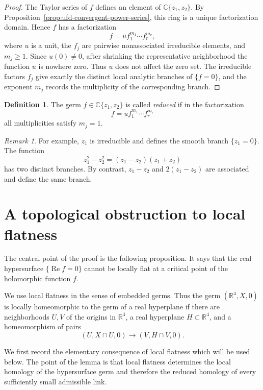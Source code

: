 \documentclass[11pt]{amsart}
\theoremstyle{definition}
\newtheorem{definition}[theorem]{Definition}
\theoremstyle{remark}
\newtheorem{remark}[theorem]{Remark}
\newcommand{\C}{\mathbb C}
\newcommand{\R}{\mathbb R}
\newcommand{\re}{\operatorname{Re}}
\begin{document}
\begin{proof}
The Taylor series of $f$ defines an element of $\C\{z_1,z_2\}$. By
Proposition~\ref{prop:ufd-convergent-power-series}, this ring is a
unique factorization domain. Hence $f$ has a factorization
\[
        f=u f_1^{m_1}\cdots f_r^{m_r},
\]
where $u$ is a unit, the $f_j$ are pairwise nonassociated irreducible
elements, and $m_j\ge1$. Since $u(0)\ne0$, after shrinking the
representative neighborhood the function $u$ is nowhere zero. Thus $u$
does not affect the zero set. The irreducible factors $f_j$ give
exactly the distinct local analytic branches of $\{f=0\}$, and the
exponent $m_j$ records the multiplicity of the corresponding branch.
\end{proof}

\begin{definition}\label{def:reduced-plane-curve}
The germ $f\in\C\{z_1,z_2\}$ is called \emph{reduced} if in the
factorization
\[
        f=u f_1^{m_1}\cdots f_r^{m_r}
\]
all multiplicities satisfy $m_j=1$.
\end{definition}

\begin{remark}\label{rem:factorization-examples}
For example, $z_1$ is irreducible and defines the smooth branch
$\{z_1=0\}$. The function
\[
        z_1^2-z_2^2=(z_1-z_2)(z_1+z_2)
\]
has two distinct branches. By contrast, $z_1-z_2$ and $2(z_1-z_2)$ are
associated and define the same branch.
\end{remark}


\section{A topological obstruction to local flatness}

The central point of the proof is the following proposition. It says
that the real hypersurface \(\{\re f=0\}\) cannot be locally flat at a
critical point of the holomorphic function \(f\).

We use local flatness in the sense of embedded germs. Thus the germ
\((\R^4,X,0)\) is locally homeomorphic to the germ of a real hyperplane if
there are neighborhoods \(U,V\) of the origins in \(\R^4\), a real
hyperplane \(H\subset\R^4\), and a homeomorphism of pairs
\[
        (U,X\cap U,0)\longrightarrow (V,H\cap V,0).
\]

We first record the elementary consequence of local flatness which will
be used below. The point of the lemma is that local flatness determines
the local homology of the hypersurface germ and therefore the reduced
homology of every sufficiently small admissible link.
\end{document}

